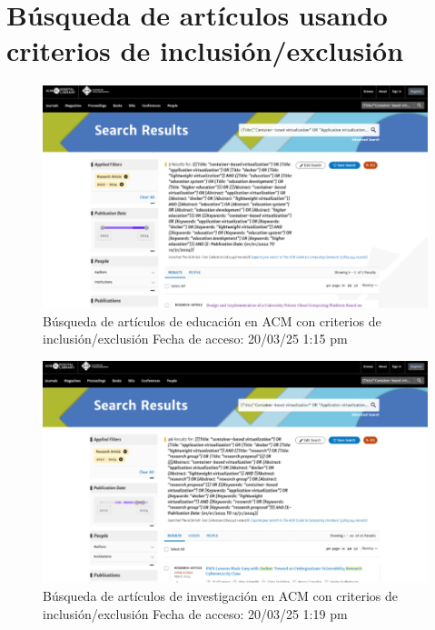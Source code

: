 \section*{Búsqueda de artículos usando criterios de inclusión/exclusión}
\begin{figure}[htbp]
    \centering
    \includegraphics[width=\textwidth,keepaspectratio]{apendices/BD/criterios/ACM-ed.png}
    \caption{Búsqueda de artículos de educación en ACM con criterios de inclusión/exclusión
    Fecha de acceso: 20/03/25 1:15 pm
    }\label{fig:busqueda16}
\end{figure}
\FloatBarrier
\begin{figure}[htbp]
    \centering
    \includegraphics[width=\textwidth,keepaspectratio]{apendices/BD/criterios/ACM-inv.png}
    \caption{Búsqueda de artículos de investigación en ACM con criterios de inclusión/exclusión
    Fecha de acceso: 20/03/25 1:19 pm
    }\label{fig:busqueda17}
\end{figure}
\FloatBarrier
